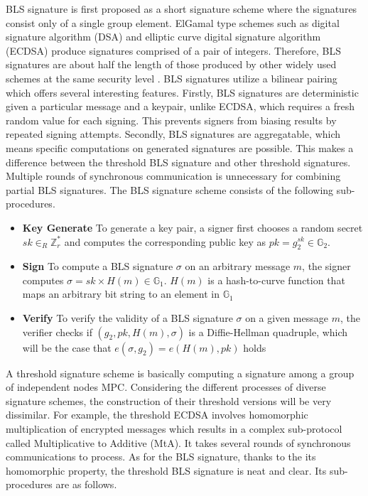 \documentclass[11pt]{article}
\begin{document}
BLS signature is first proposed as a short signature scheme where the signatures consist only of a single group element. ElGamal type schemes such as digital signature algorithm (DSA) and elliptic curve digital signature algorithm (ECDSA) produce signatures comprised of a pair of integers. Therefore, BLS signatures are about half the length of those produced by other widely used schemes at the same security level \cite{menezes2009introduction}. BLS signatures utilize a bilinear pairing which offers several interesting features. Firstly, BLS signatures are deterministic given a particular message and a keypair, unlike ECDSA, which requires a fresh random value for each signing. This prevents signers from biasing results by repeated signing attempts. Secondly, BLS signatures are aggregatable, which means specific computations on generated signatures are possible. This makes a difference between the threshold BLS signature and other threshold signatures. Multiple rounds of synchronous communication is unnecessary for combining partial BLS signatures. The BLS signature scheme consists of the following sub-procedures.
\begin{itemize}
    \item[] \textbf{Key Generate} To generate a key pair, a signer first chooses a random secret $sk \in_R \mathbb{Z}_r^*$ and computes the corresponding public key as $pk = g_2^{sk} \in \mathbb{G}_2$.
    \item[] \textbf{Sign} To compute a BLS signature $\sigma$ on an arbitrary message $m$, the signer computes $\sigma = sk \times H(m) \in \mathbb{G}_1$. $H(m)$ is a hash-to-curve function that maps an arbitrary bit string to an element in $\mathbb{G}_1$
    \item[] \textbf{Verify} To verify the validity of a BLS signature $\sigma$ on a given message $m$, the verifier checks if $(g_2,pk,H(m),\sigma)$ is a Diffie-Hellman quadruple, which will be the case that $e(\sigma,g_2)=e(H(m),pk)$ holds
\end{itemize}

A threshold signature scheme is basically computing a signature among a group of independent nodes MPC. Considering the different processes of diverse signature schemes, the construction of their threshold versions will be very dissimilar. For example, the threshold ECDSA involves homomorphic multiplication of encrypted messages which results in a complex sub-protocol called Multiplicative to Additive (MtA). It takes several rounds of synchronous communications to process. As for the BLS signature, thanks to the its homomorphic property, the threshold BLS signature is neat and clear. Its sub-procedures are as follows.
\end{document}
